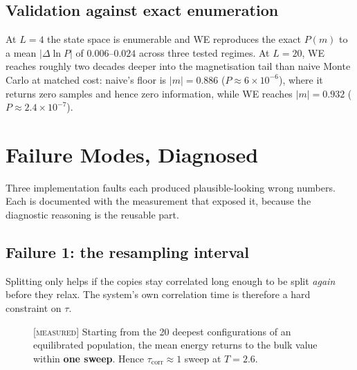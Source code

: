 \documentclass[11pt,a4paper]{article}
\newcommand{\MEAS}{\textcolor{blue!60!black}{\footnotesize[\textsc{measured}]}}
\begin{document}
\subsection{Validation against exact enumeration}\label{sec:validation}
At $L=4$ the state space is enumerable and WE reproduces the exact $P(m)$ to a mean
$|\Delta\ln P|$ of $0.006$--$0.024$ across three tested regimes. At $L=20$, WE reaches roughly two
decades deeper into the magnetisation tail than naive Monte Carlo at matched cost: naive's floor
is $|m|=0.886$ ($P\approx6\times10^{-6}$), where it returns zero samples and hence zero
information, while WE reaches $|m|=0.932$ ($P\approx2.4\times10^{-7}$).

\section{Failure Modes, Diagnosed}\label{sec:fail}

Three implementation faults each produced plausible-looking wrong numbers. Each is documented
with the measurement that exposed it, because the diagnostic reasoning is the reusable part.

\subsection{Failure 1: the resampling interval}\label{sec:tau}
Splitting only helps if the copies stay correlated long enough to be split \emph{again} before
they relax. The system's own correlation time is therefore a hard constraint on $\tau$.

\begin{figure}[H]\centering
{}
\caption{\MEAS{} Starting from the 20 deepest configurations of an equilibrated population, the
mean energy returns to the bulk value within \textbf{one sweep}. Hence
$\tau_{\mathrm{corr}}\approx1$ sweep at $T=2.6$.}
\label{fig:relax}
\end{figure}
\end{document}
